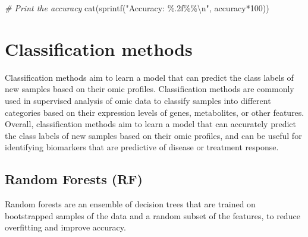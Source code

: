 \documentclass[
]{book}
\newenvironment{Shaded}{\begin{snugshade}}{\end{snugshade}}
\newcommand{\CommentTok}[1]{\textcolor[rgb]{0.56,0.35,0.01}{\textit{#1}}}
\newcommand{\DecValTok}[1]{\textcolor[rgb]{0.00,0.00,0.81}{#1}}
\newcommand{\FunctionTok}[1]{\textcolor[rgb]{0.00,0.00,0.00}{#1}}
\newcommand{\NormalTok}[1]{#1}
\newcommand{\SpecialCharTok}[1]{\textcolor[rgb]{0.00,0.00,0.00}{#1}}
\newcommand{\StringTok}[1]{\textcolor[rgb]{0.31,0.60,0.02}{#1}}
\begin{document}
\begin{Shaded}
\begin{Highlighting}[]
\CommentTok{\# Print the accuracy}
\FunctionTok{cat}\NormalTok{(}\FunctionTok{sprintf}\NormalTok{(}\StringTok{"Accuracy: \%.2f\%\%}\SpecialCharTok{\textbackslash{}n}\StringTok{"}\NormalTok{, accuracy}\SpecialCharTok{*}\DecValTok{100}\NormalTok{))}
\end{Highlighting}
\end{Shaded}

\hypertarget{classification-methods}{%
\section{Classification methods}\label{classification-methods}}

Classification methods aim to learn a model that can predict the class labels of new samples based on their omic profiles. Classification methods are commonly used in supervised analysis of omic data to classify samples into different categories based on their expression levels of genes, metabolites, or other features. Overall, classification methods aim to learn a model that can accurately predict the class labels of new samples based on their omic profiles, and can be useful for identifying biomarkers that are predictive of disease or treatment response.

\hypertarget{random-forests}{%
\subsection{Random Forests (RF)}\label{random-forests}}

Random forests are an ensemble of decision trees that are trained on bootstrapped samples of the data and a random subset of the features, to reduce overfitting and improve accuracy.
\end{document}
